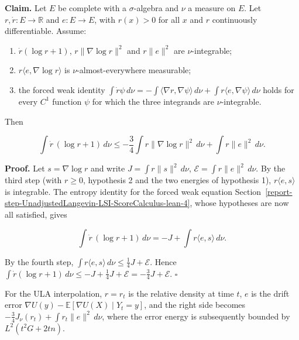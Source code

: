 \documentclass[11pt,a4paper]{report}
\begin{document}
\textbf{Claim.} Let \(E\) be complete with a \(\sigma\)-algebra and \(\nu\) a measure on \(E\). Let \(r,\dot r:E\to\mathbb R\) and \(e:E\to E\), with \(r(x)>0\) for all \(x\) and \(r\) continuously differentiable. Assume:



\begin{enumerate}


\item \(\dot r(\log r+1)\), \(r\|\nabla\log r\|^2\) and \(r\|e\|^2\) are \(\nu\)-integrable;

\item \(r\langle e,\nabla\log r\rangle\) is \(\nu\)-almost-everywhere measurable;

\item the forced weak identity \(\int\dot r\psi\,d\nu=-\int\langle\nabla r,\nabla\psi\rangle\,d\nu+\int r\langle e,\nabla\psi\rangle\,d\nu\) holds for every \(C^1\) function \(\psi\) for which the three integrands are \(\nu\)-integrable.

\end{enumerate}



Then


\[\int\dot r\,(\log r+1)\,d\nu\le-\frac34\int r\|\nabla\log r\|^2\,d\nu+\int r\|e\|^2\,d\nu.\]


\textbf{Proof.} Let \(s=\nabla\log r\) and write \(J=\int r\|s\|^2\,d\nu\), \(\mathcal E=\int r\|e\|^2\,d\nu\). By the third step (with \(r\ge0\), hypothesis 2 and the two energies of hypothesis 1), \(r\langle e,s\rangle\) is integrable. The entropy identity for the forced weak equation Section~\ref{report-step-UnadjustedLangevin-LSI-ScoreCalculus-lean-4}, whose hypotheses are now all satisfied, gives


\[\int\dot r\,(\log r+1)\,d\nu=-J+\int r\langle e,s\rangle\,d\nu.\]


By the fourth step, \(\int r\langle e,s\rangle\,d\nu\le\frac14J+\mathcal E\). Hence \(\int\dot r(\log r+1)\,d\nu\le-J+\frac14J+\mathcal E=-\frac34J+\mathcal E\). \(\square\)




For the ULA interpolation, \(r=r_t\) is the relative density at time \(t\), \(e\) is the drift error \(\nabla U(y)-\mathbb E[\nabla U(X)\mid Y_t=y]\), and the right side becomes \(-\frac34J_\nu(r_t)+\int r_t\|e\|^2\,d\nu\), where the error energy is subsequently bounded by \(L^2(t^2G+2tn)\).
\end{document}

